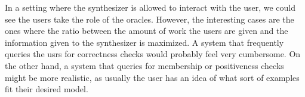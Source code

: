 In a setting where the synthesizer is allowed to interact with the user, we
could see the users take the role of the oracles.
However, the interesting cases are the ones where the ratio between the amount
of work the users are given and the information given to the synthesizer is
maximized.
A system that frequently queries the usrs for correctness checks would probably
feel very cumbersome.
On the other hand, a system that queries for membership or positiveness checks
might be more realistic, as usually the user has an idea of what sort of
examples fit their desired model.

